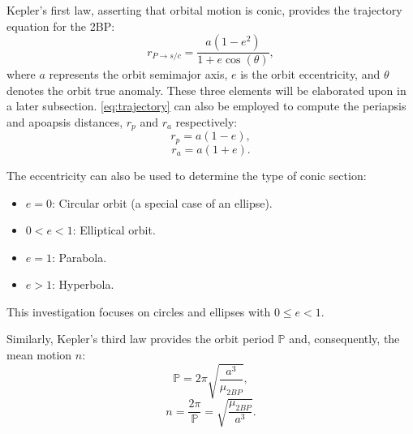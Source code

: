 Kepler's first law, asserting that orbital motion is conic, provides the trajectory equation for
the 2BP:
\begin{equation}
    r_{P\rightarrow s/c}=\frac{a(1-e^{2})}{1+e\cos(\theta)},
    \label{eq:trajectory}
\end{equation}
where $a$ represents the orbit semimajor axis, $e$ is the orbit eccentricity, and $\theta$ denotes
the orbit true anomaly. These three elements will be elaborated upon in a later subsection.
\cref{eq:trajectory} can also be employed to compute the periapsis and apoapsis distances, $r_{p}$
and $r_{a}$ respectively:
\begin{equation}
    r_{p}=a(1-e),
    \label{eq:periapsis}
\end{equation}
\begin{equation}
    r_{a}=a(1+e).
    \label{eq:apoapsis}
\end{equation}

The eccentricity can also be used to determine the type of conic section:
\begin{itemize}
    \item   $e=0$: Circular orbit (a special case of an ellipse).
    \item   $0<e<1$: Elliptical orbit.
    \item   $e=1$: Parabola.
    \item   $e>1$: Hyperbola.
\end{itemize}
This investigation focuses on circles and ellipses with $0\leq e<1$.

Similarly, Kepler's third law provides the orbit period $\mathbb{P}$ and, consequently, the mean
motion $n$:
\begin{equation}
    \mathbb{P}=2\pi\sqrt{\frac{a^{3}}{\mu_{2BP}}},
    \label{eq:period}
\end{equation}
\begin{equation}
    n=\frac{2\pi}{\mathbb{P}}=\sqrt{\frac{\mu_{2BP}}{a^{3}}}.
    \label{eq:meanmotion}
\end{equation}

